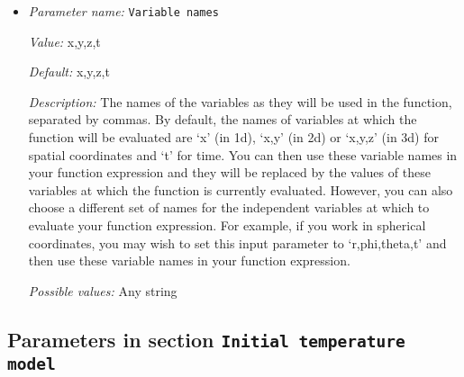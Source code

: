 \begin{itemize}
{\it Value:} 0


{\it Default:} 0


{\it Description:} The formula that denotes the function you want to evaluate for particular values of the independent variables. This expression may contain any of the usual operations such as addition or multiplication, as well as all of the common functions such as `sin' or `cos'. In addition, it may contain expressions like `if(x>0, 1, -1)' where the expression evaluates to the second argument if the first argument is true, and to the third argument otherwise. For a full overview of possible expressions accepted see the documentation of the muparser library at http://muparser.beltoforion.de/.

If the function you are describing represents a vector-valued function with multiple components, then separate the expressions for individual components by a semicolon.


{\it Possible values:} Any string
\item {\it Parameter name:} {\tt Variable names}
\label{parameters:Initial composition model/Function/Variable names}
\label{parameters:Initial_20composition_20model/Function/Variable_20names}


{\it Value:} x,y,z,t


{\it Default:} x,y,z,t


{\it Description:} The names of the variables as they will be used in the function, separated by commas. By default, the names of variables at which the function will be evaluated are `x' (in 1d), `x,y' (in 2d) or `x,y,z' (in 3d) for spatial coordinates and `t' for time. You can then use these variable names in your function expression and they will be replaced by the values of these variables at which the function is currently evaluated. However, you can also choose a different set of names for the independent variables at which to evaluate your function expression. For example, if you work in spherical coordinates, you may wish to set this input parameter to `r,phi,theta,t' and then use these variable names in your function expression.


{\it Possible values:} Any string
\end{itemize}

\subsection{Parameters in section \tt Initial temperature model}
\label{parameters:Initial_20temperature_20model}

